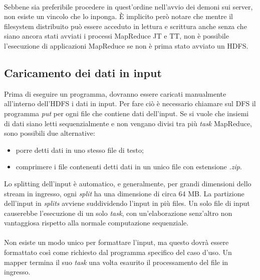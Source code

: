 \documentclass[a4paper,11pt]{report}
\begin{document}
\paragraph{}
Sebbene sia preferibile procedere in quest'ordine nell'avvio dei demoni sui server, non esiste un vincolo che lo inponga.
È implicito però notare che mentre il filesystem distribuito può essere acceduto in lettura e scrittura anche senza che siano ancora stati
avviati i processi MapReduce JT e TT,
non è possibile l'esecuzione di applicazioni MapReduce se non è prima stato avviato un HDFS.

\subsection{Caricamento dei dati in input}
Prima di eseguire un programma, dovranno essere caricati manualmente all'interno dell'HDFS i dati in input. Per fare ciò è necessario
chiamare sul DFS il programma
\emph{put} per ogni file che contiene dati dell'input. Se si vuole che insiemi di dati siano letti sequenzialmente e non vengano divisi tra
più \emph{task} MapReduce,
sono possibili due alternative:
\begin{itemize}
 \item porre detti dati in uno stesso file di testo;
 \item comprimere i file contenenti detti dati in un unico file con estensione \emph{.zip}.
\end{itemize}
Lo splitting dell'input è automatico, e generalmente, per grandi dimensioni dello stream in ingresso, ogni \emph{split} ha una dimensione di
circa 64 MB.
La partizione dell'input in \emph{splits} avviene suddividendo l'input in più files. Un solo file di input causerebbe l'esecuzione di un
solo \emph{task},
con un'elaborazione senz'altro non vantaggiosa rispetto alla normale computazione sequenziale.
\paragraph{}
Non esiste un modo unico per formattare l'input, ma questo dovrà essere formattato così come richiesto dal programma specifico del caso
d'uso.
Un mapper termina il suo \emph{task} una volta esaurito il processamento del file in ingresso.
\end{document}
